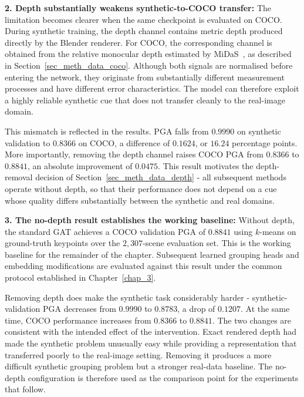 \textbf{2. Depth substantially weakens synthetic-to-COCO transfer:}
The limitation becomes clearer when the same checkpoint is evaluated
on COCO.
During synthetic training,
the depth channel contains metric depth produced directly
by the Blender renderer.
For COCO,
the corresponding channel is obtained from the relative monocular depth
estimated by MiDaS~\cite{ranftl2020midas},
as described in Section~\ref{sec_meth_data_coco}.
Although both signals are normalised before entering the network,
they originate from substantially different measurement processes
and have different error characteristics.
The model can therefore exploit a highly reliable synthetic cue
that does not transfer cleanly to the real-image domain.

This mismatch is reflected in the results.
PGA falls from $0.9990$ on synthetic validation to $0.8366$ on COCO,
a difference of $0.1624$,
or $16.24$ percentage points.
More importantly,
removing the depth channel raises COCO PGA from $0.8366$ to $0.8841$,
an absolute improvement of $0.0475$.
This result motivates the depth-removal decision of
Section~\ref{sec_meth_data_depth} -
all subsequent methods operate without depth,
so that their performance does not depend on a cue whose quality
differs substantially between the synthetic and real domains.

\textbf{3. The no-depth result establishes the working baseline:}
Without depth,
the standard GAT achieves a COCO validation PGA of $0.8841$
using $k$-means on ground-truth keypoints over the $2{,}307$-scene
evaluation set.
This is the working baseline for the remainder of the chapter.
Subsequent learned grouping heads and embedding modifications
are evaluated against this result under the common protocol established
in Chapter~\ref{chap_3}.

Removing depth does make the synthetic task considerably harder -
synthetic-validation PGA decreases from $0.9990$ to $0.8783$,
a drop of $0.1207$.
At the same time,
COCO performance increases from $0.8366$ to $0.8841$.
The two changes are consistent with the intended effect
of the intervention.
Exact rendered depth had made the synthetic problem unusually easy
while providing a representation that transferred poorly
to the real-image setting.
Removing it produces a more difficult synthetic grouping problem
but a stronger real-data baseline.
The no-depth configuration is therefore used as the comparison point
for the experiments that follow.